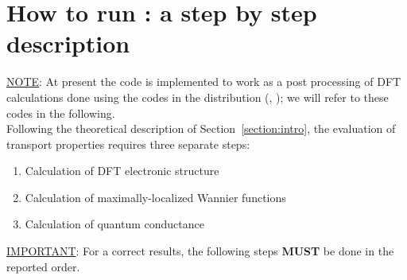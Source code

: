 
\thispagestyle{empty}
\section{How to run \WANT{}: a step by step description}\label{sec:run}

\noindent \underline {NOTE}: At present the \WANT{} code is
implemented to work as a post processing of DFT
calculations done using the codes in the \QUANTUMESPRESSO{} distribution 
(\QUANTUMESPRESSOURL, \PWSCFURL); we will refer to these codes in the following.\\

\noindent Following the theoretical description of
Section~\ref{section:intro}, the evaluation of transport
properties requires three separate steps:

\begin{enumerate}
\item Calculation of DFT electronic structure
\item Calculation of maximally-localized Wannier functions
\item Calculation of quantum conductance
\end{enumerate}

\noindent \underline{IMPORTANT}: For a correct results, the
following steps \textbf{MUST} be done in the reported order.

